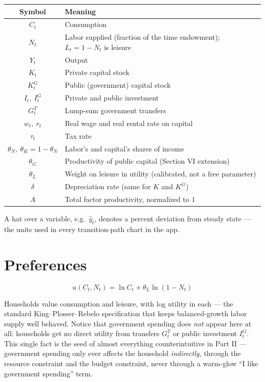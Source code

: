 \documentclass[11pt]{article}
\newcommand{\eq}[1]{\begin{equation}#1\end{equation}}
\begin{document}
\begin{center}
\begin{tabular}{cl}
\toprule
Symbol & Meaning \\
\midrule
$C_t$ & Consumption \\
$N_t$ & Labor supplied (fraction of the time endowment); $L_t=1-N_t$ is leisure \\
$Y_t$ & Output \\
$K_t$ & Private capital stock \\
$K^G_t$ & Public (government) capital stock \\
$I_t,\ I^G_t$ & Private and public investment \\
$G^T_t$ & Lump-sum government transfers \\
$w_t,\ r_t$ & Real wage and real rental rate on capital \\
$\tau_t$ & Tax rate \\
$\theta_N,\ \theta_K=1-\theta_N$ & Labor's and capital's shares of income \\
$\theta_G$ & Productivity of public capital (Section VI extension) \\
$\theta_L$ & Weight on leisure in utility (calibrated, not a free parameter) \\
$\delta$ & Depreciation rate (same for $K$ and $K^G$) \\
$A$ & Total factor productivity, normalized to $1$ \\
\bottomrule
\end{tabular}
\end{center}

A hat over a variable, e.g.\ $\hat y_t$, denotes a percent deviation from
steady state --- the units used in every transition-path chart in the app.

\section{Preferences}

\eq{ u(C_t,N_t) = \ln C_t + \theta_L \ln(1-N_t) }

Households value consumption and leisure, with log utility in each --- the
standard King--Plosser--Rebelo specification that keeps balanced-growth
labor supply well behaved. Notice that government spending does \emph{not}
appear here at all: households get no direct utility from transfers
$G^T_t$ or public investment $I^G_t$. This single fact is the seed of
almost everything counterintuitive in Part II --- government spending only
ever affects the household \emph{indirectly}, through the resource
constraint and the budget constraint, never through a warm-glow ``I like
government spending'' term.
\end{document}
